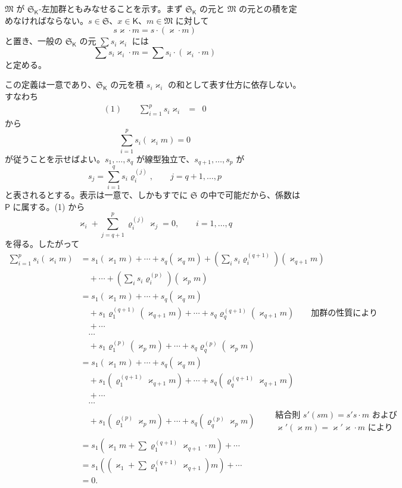 $\mathfrak M$ が $\mathfrak S_{\mathsf K}$-左加群ともみなせることを示す。まず $\mathfrak S_{\mathsf K}$ の元と $\mathfrak M$ の元との積を定めなければならない。$s\in\mathfrak S$、$x\in\mathsf K$、$m\in\mathfrak M$ に対して
\[
s\varkappa \cdot m=s\cdot(\varkappa \cdot m)
\]
と置き、一般の $\mathfrak S_{\mathsf K}$ の元 $\sum s_i\varkappa _i$ には
\[
\sum s_i\varkappa _i\cdot m=\sum s_i\cdot(\varkappa _i\cdot m)
\]
と定める。

この定義は一意であり、$\mathfrak S_{\mathsf K}$ の元を積 $s_i\varkappa _i$ の和として表す仕方に依存しない。すなわち
\[
\begin{array}{rcl}
(1)\qquad \displaystyle\sum_{i=1}^{p}s_i\varkappa _i&=&0
\end{array}
\]
から
\[
\sum_{i=1}^{p}s_i(\varkappa _i m)=0
\]
が従うことを示せばよい。$s_1,\ldots,s_q$ が線型独立で、$s_{q+1},\ldots,s_p$ が
\[
s_j=\sum_{i=1}^{q}s_i\varrho_i^{(j)},\qquad j=q+1,\ldots,p
\]
と表されるとする。表示は一意で、しかもすでに $\mathfrak S$ の中で可能だから、係数は $\mathsf P$ に属する。(1) から
\[
\varkappa _i+\sum_{j=q+1}^{p}\varrho_i^{(j)}\varkappa _j=0,\qquad i=1,\ldots,q
\]
を得る。したがって
\[
\begin{aligned}
\sum_{i=1}^{p}s_i(\varkappa _i m)
&=s_1(\varkappa _1m)+\cdots+s_q(\varkappa _qm)
  +\left(\sum_i s_i\varrho_i^{(q+1)}\right)(\varkappa _{q+1}m)\\
&\quad+\cdots+\left(\sum_i s_i\varrho_i^{(p)}\right)(\varkappa _pm)\\
&=s_1(\varkappa _1m)+\cdots+s_q(\varkappa _qm)\\
&\quad+s_1\varrho_1^{(q+1)}(\varkappa _{q+1}m)+\cdots+s_q\varrho_q^{(q+1)}(\varkappa _{q+1}m)
  \qquad\text{加群の性質により}\\
&\quad+\cdots\\
&\quad\cdots\\
&\quad+s_1\varrho_1^{(p)}(\varkappa _pm)+\cdots+s_q\varrho_q^{(p)}(\varkappa _pm)\\
&=s_1(\varkappa _1m)+\cdots+s_q(\varkappa _qm)\\
&\quad+s_1(\varrho_1^{(q+1)}\varkappa _{q+1}m)+\cdots+s_q(\varrho_q^{(q+1)}\varkappa _{q+1}m)\\
&\quad+\cdots\\
&\quad\cdots\\
&\quad+s_1(\varrho_1^{(p)}\varkappa _pm)+\cdots+s_q(\varrho_q^{(p)}\varkappa _pm)
  \qquad\begin{gathered}\text{結合則 }s'(sm)=s's\cdot m\text{ および}\\ \varkappa'(\varkappa m)=\varkappa'\varkappa\cdot m\text{ により}\end{gathered}\\
&=s_1\left(\varkappa _1m+\sum\varrho_1^{(q+1)}\varkappa _{q+1}\cdot m\right)+\cdots\\
&=s_1\left(\left(\varkappa _1+\sum\varrho_1^{(q+1)}\varkappa _{q+1}\right)m\right)+\cdots\\
&=0.
\end{aligned}
\]

